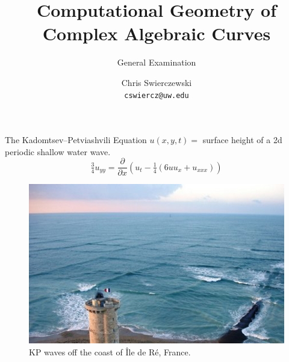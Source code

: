 \documentclass{beamer}
\title{Computational Geometry of Complex Algebraic Curves}
\subtitle{General Examination}
\author{
  Chris Swierczewski\\
  {\tt cswiercz@uw.edu}
}
\institute{
  Department of Applied Mathematics\\
  University of Washington\\
  Seattle, Washington
}
\begin{document}



\begin{frame}
  \titlepage
\end{frame}







\begin{frame}{The Kadomtsev--Petviashvili Equation}{}
  \vspace{10pt}
  $u(x,y,t) = $ surface height of a 2d periodic shallow water wave.
  \[
  \tfrac{3}{4} u_{yy} = \frac{\partial}{\partial x} \left(
  u_t - \tfrac{1}{4} \left(6uu_x + u_{xxx}\right) \right)
  \]

  \begin{figure}
    \centering
    \includegraphics[height=0.4\textheight]{images/livekp.jpg}
    \caption{KP waves off the coast of \^{I}le de R\'{e}, France.}
  \end{figure}
\end{frame}
\end{document}
